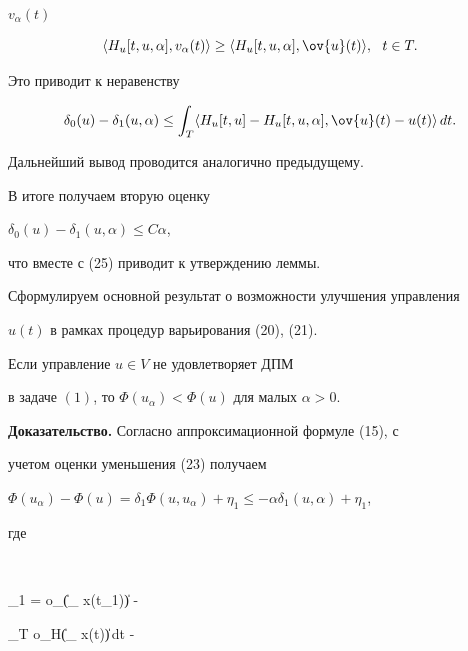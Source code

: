 $v_{\alpha}(t)$


$$


\langle H_{u}[t, u, \alpha], v_{\alpha}(t)\rangle \geq


\langle H_{u}[t, u, \alpha], \ov{u}(t)\rangle,\ \ t \in T.


$$


Это приводит к неравенству


$$


\delta_{0}(u) - \delta_{1}(u, \alpha) \leq \int_{T}


\langle H_{u}[t, u] - H_{u}[t, u, \alpha], \ov{u}(t) - u(t)\rangle\,dt.


$$


Дальнейший вывод проводится аналогично предыдущему. 


В итоге получаем вторую оценку


$\delta_{0}(u) - \delta_{1}(u, \alpha) \leq C \alpha$,


что вместе с (25) приводит к утверждению леммы.





Сформулируем основной результат о возможности улучшения управления


$u(t)$ в рамках процедур варьирования (20), (21).





\begin{thmnonum}


Если управление $u \in V$ не удовлетворяет ДПМ


в задаче $(1)$, то $\Phi(u_{\alpha}) < \Phi(u)$ для малых $\alpha> 0$.


\end{thmnonum}





{\bf Доказательство.} Согласно аппроксимационной формуле (15), с


учетом оценки уменьшения (23) получаем


$\Phi(u_{\alpha}) - \Phi(u) = \delta_{1}


\Phi(u, u_{\alpha}) + \eta_{1} \leq - \alpha


\delta_{1}(u, \alpha) + \eta_{1}$,


где


$$


\eta_{1} = o_{\varphi}(\| \Delta_{\alpha} x(t_{1})\|) -


\int_{T} o_{H}(\| \Delta_{\alpha} x(t)\|)\,dt -


